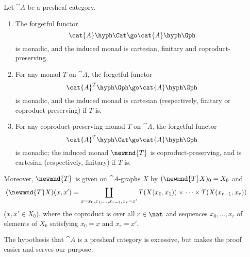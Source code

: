 \begin{propn}	
Let $\cat{A}$ be a presheaf category.
%
\begin{enumerate}
\item	{}
The forgetful functor 
\[
\cat{A}\hyph\Cat \go \cat{A}\hyph\Gph
\]
is monadic, and the induced monad is cartesian, finitary and
coproduct-preserving.
\item	{}
For any monad $T$ on $\cat{A}$, the forgetful functor 
\[
\cat{A}^T\hyph\Gph \go \cat{A}\hyph\Gph
\]
is monadic, and the induced monad is cartesian (respectively, finitary or
coproduct-preserving) if $T$ is.
\item	{}
For any coproduct-preserving monad $T$ on $\cat{A}$, the forgetful functor 
\[
\cat{A}^T\hyph\Cat \go \cat{A}\hyph\Gph
\]
is monadic; the induced monad $\newmnd{T}$ is coproduct-preserving, and is
cartesian (respectively, finitary) if $T$ is.
\end{enumerate}
%
Moreover, $\newmnd{T}$ 
is given on $\cat{A}$-graphs $X$ by $(\newmnd{T}X)_0 = X_0$ and
\[
(\newmnd{T}X)(x,x') 
=
\coprod_{x=x_0, x_1, \ldots, x_{r-1}, x_r=x'}
T(X(x_0, x_1)) \times\cdots\times T(X(x_{r-1},x_r))
\]
($x,x' \in X_0$), where the coproduct is over all $r\in\nat$ and sequences
$x_0, \ldots, x_r$ of elements of $X_0$ satisfying $x_0 = x$ and $x_r =
x'$.
\end{propn}
%
The hypothesis that $\cat{A}$ is a presheaf category is excessive, but
makes the proof easier and serves our purpose.
%
